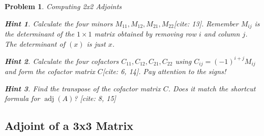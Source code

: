 \documentclass[12pt]{article}
\newtheorem{problem}{Problem}[section]
\theoremstyle{definition}
\newtheorem{hint}{Hint}[question]
\newcommand{\adj}{\operatorname{adj}}
\begin{document}
\begin{problem}{Computing 2x2 Adjoints}
        \begin{hint}
            Calculate the four minors $M_{11}, M_{12}, M_{21}, M_{22}$[cite: 13]. Remember $M_{ij}$ is the determinant of the $1 \times 1$ matrix obtained by removing row $i$ and column $j$. The determinant of $(x)$ is just $x$.
        \end{hint}
        \begin{hint}
            Calculate the four cofactors $C_{11}, C_{12}, C_{21}, C_{22}$ using $C_{ij} = (-1)^{i+j} M_{ij}$ and form the cofactor matrix $C$[cite: 6, 14]. Pay attention to the signs!
        \end{hint}
        \begin{hint}
            Find the transpose of the cofactor matrix $C$. Does it match the shortcut formula for $\adj(A)$? [cite: 8, 15]
        \end{hint}
    
\end{problem}

\subsection{Adjoint of a 3x3 Matrix}
\end{document}
